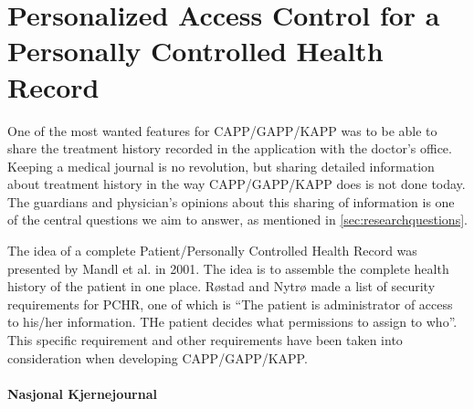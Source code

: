 \section{Personalized Access Control for a Personally Controlled Health Record}
\label{personalhealthrecords}

One of the most wanted features for CAPP/GAPP/KAPP was to be able to share the treatment history recorded in the application with the doctor's office. Keeping a medical journal is no revolution, but sharing detailed information about treatment history in the way CAPP/GAPP/KAPP does is not done today. The guardians and physician's opinions about this sharing of information is one of the central questions we aim to answer, as mentioned in \ref{sec:researchquestions}.

The idea of a complete Patient/Personally Controlled Health Record was presented by Mandl et al.\cite{mandl2007indivo} in 2001. The idea is to assemble the complete health history of the patient in one place. Røstad and Nytrø \cite{rostad2008personalized} made a list of security requirements for PCHR, one of which is ``The patient is administrator of access to his/her information. THe patient decides what permissions to assign to who''. This specific requirement and other requirements\cite{rostad2008personalized} have been taken into consideration when developing CAPP/GAPP/KAPP. 



\paragraph{Nasjonal Kjernejournal}
